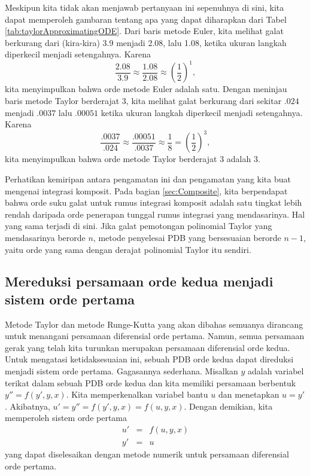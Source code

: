 Meskipun kita tidak akan menjawab pertanyaan ini sepenuhnya di sini,
kita dapat memperoleh gambaran tentang apa yang dapat diharapkan dari
Tabel \ref{tab:taylorApproximatingODE}. Dari baris metode Euler,
kita melihat galat berkurang dari (kira-kira) 3.9 menjadi 2.08, lalu
1.08, ketika ukuran langkah diperkecil menjadi setengahnya. Karena
\[
\frac{2.08}{3.9}\approx\frac{1.08}{2.08}\approx\left(\frac{1}{2}\right)^{1},
\]
kita menyimpulkan bahwa orde metode Euler adalah satu. Dengan meninjau
baris metode Taylor berderajat 3, kita melihat galat berkurang dari
sekitar $.024$ menjadi $.0037$ lalu $.00051$ ketika ukuran langkah
diperkecil menjadi setengahnya. Karena
\[
\frac{.0037}{.024}\approx\frac{.00051}{.0037}\approx\frac{1}{8}=\left(\frac{1}{2}\right)^{3},
\]
kita menyimpulkan bahwa orde metode Taylor berderajat 3 adalah 3.

Perhatikan kemiripan antara pengamatan ini dan pengamatan yang kita
buat mengenai integrasi komposit. Pada bagian \ref{sec:Composite},
kita berpendapat bahwa orde suku galat untuk rumus integrasi komposit
adalah satu tingkat lebih rendah daripada orde penerapan tunggal rumus
integrasi yang mendasarinya. Hal yang sama terjadi di sini. Jika galat
pemotongan polinomial Taylor yang mendasarinya berorde $n$, metode
penyelesai PDB yang bersesuaian berorde $n-1$, yaitu orde yang sama
dengan derajat polinomial Taylor itu sendiri.

\subsection{Mereduksi persamaan orde kedua menjadi sistem orde pertama }

Metode Taylor dan metode Runge-Kutta yang akan dibahas semuanya dirancang
untuk menangani persamaan diferensial orde pertama. Namun, semua persamaan
gerak yang telah kita turunkan merupakan persamaan diferensial orde
kedua. Untuk mengatasi ketidaksesuaian ini, sebuah PDB orde kedua
dapat direduksi menjadi sistem orde pertama. Gagasannya sederhana.
Misalkan $y$ adalah variabel terikat dalam sebuah PDB orde kedua
dan kita memiliki persamaan berbentuk $y''=f(y',y,x)$. Kita memperkenalkan
variabel bantu $u$ dan menetapkan $u=y'$. Akibatnya, $u'=y''=f(y',y,x)=f(u,y,x)$.
Dengan demikian, kita memperoleh sistem orde pertama
\begin{eqnarray*}
u' & = & f(u,y,x)\\
y' & = & u
\end{eqnarray*}
yang dapat diselesaikan dengan metode numerik untuk persamaan diferensial
orde pertama. 


